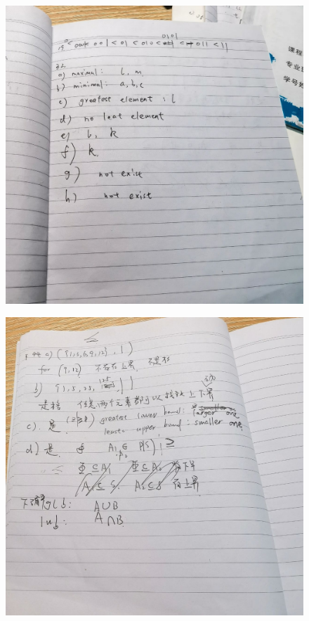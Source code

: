 \documentclass{article}
\begin{document}
    \begin{figure}[H]
    \centering
    \includegraphics[width=1\textwidth]{hw10/IMG_20221205_183739.jpg}
    \caption{\label{Lab9}}
    \end{figure}

    \begin{figure}[H]
    \centering
    \includegraphics[width=1\textwidth]{hw10/IMG_20221205_183744.jpg}
    \caption{\label{Lab9}}
    \end{figure}
\end{document}
